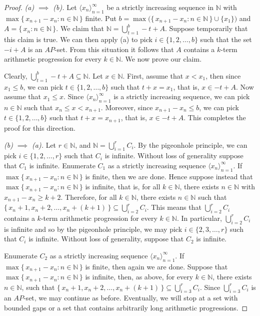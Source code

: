 \documentclass[12pt,showtrims]{memoir}
\theoremstyle{plain}
\theoremstyle{definition}
\newcommand{\la}{\langle}
\newcommand{\ra}{\rangle}
\newcommand{\bbN}{\mathbb{N}}
\begin{document}
\begin{proof}
  \textsl{(a) $\implies$ (b).}
  Let $\la x_n \ra_{n=1}^\infty$ be a strictly increasing sequence in $\bbN$ with $\max\{\, x_{n+1} - x_n : n \in \bbN \,\}$ finite. 
  Put $b =\max\bigl(\{\, x_{n+1} - x_n : n \in \bbN \,\} \cup \{x_1\}\bigr)$ and $A = \{\, x_n : n \in \bbN \,\}$. 
  We claim that $\bbN = \bigcup_{t=1}^b -t+A$. 
  Suppose temporarily that this claim is true.
  We can then apply (a) to pick $i \in \{1, 2, \ldots, b\}$ such that the set $-i + A$ is an $AP$-set. 
  From this situation it follows that $A$ contains a $k$-term arithmetic progression for every $k \in \bbN$. 
  We now prove our claim.
  
  Clearly, $\bigcup_{t=1}^b -t+A \subseteq \bbN$.
  Let $x \in \bbN$.
  First, assume that $x < x_1$, then since $x_1 \le b$, we can pick $t \in \{1, 2, \ldots, b\}$ such that $t + x = x_1$, that is, $x \in -t+A$.
  Now assume that $x_1 \le x$.
  Since $\la x_n \ra_{n=1}^\infty$ is a strictly increasing sequence, we can pick $n \in \bbN$ such that $x_n \le x < x_{n+1}$.
  Moreover, since $x_{n+1} - x_n \le b$, we can pick $t \in \{1, 2, \ldots, b\}$ such that $t + x = x_{n+1}$, that is, $x \in -t + A$. 
  This completes the proof for this direction. 

  \textsl{(b) $\implies$ (a).}
  Let $r \in \bbN$, and $\bbN = \bigcup_{i=1}^r C_i$. 
  By the pigeonhole principle, we can pick $i \in \{1, 2, \ldots, r\}$ such that $C_i$ is infinite.
  Without loss of generality suppose that $C_1$ is infinite. 
  Enumerate $C_1$ as a strictly increasing sequence $\la x_n \ra_{n=1}^\infty$.
  If $\max\{\, x_{n+1} - x_n : n \in \bbN \,\}$ is finite, then we are done. 
  Hence suppose instead that $\max\{\, x_{n+1} - x_n : n \in \bbN \,\}$ is infinite, that is, for all $k \in \bbN$, there exists $n \in \bbN$ with $x_{n+1} - x_n \ge k + 2$. 
  Therefore, for all $k \in \bbN$, there exists $n \in \bbN$ such that $\{\, x_n + 1, x_n + 2, \ldots, x_n + (k + 1) \,\} \subseteq \bigcup_{i=2}^r C_i$. 
  This means that $\bigcup_{i=2}^r C_i$ contains a \mbox{$k$-term} arithmetic progression for every $k \in \bbN$.
  In particular, $\bigcup_{i=2}^r C_i$ is infinite and so by the pigeonhole principle, we may pick $i \in \{2, 3, \ldots, r\}$ such that $C_i$ is infinite.
  Without loss of generality, suppose that $C_2$ is infinite.

  Enumerate $C_2$ as a strictly increasing sequence $\la x_n \ra_{n=1}^\infty$.
  If $\max\{\, x_{n+1} - x_n : n \in \bbN \,\}$ is finite, then again we are done.
  Suppose that $\max\{\, x_{n+1} - x_n : n \in \bbN \,\}$ is infinite, then, as above, for every $k \in \bbN$, there exists $n \in \bbN$, such that $\{\, x_n +1, x_n + 2, \ldots, x_n + (k +1) \,\}  \subseteq \bigcup_{i=3}^r C_i$. 
  Since $\bigcup_{i=3}^r C_i$ is an $AP$-set, we may continue as before.
  Eventually, we will stop at a set with bounded gaps or a set that contains arbitrarily long arithmetic progressions.
\end{proof}
\end{document}
